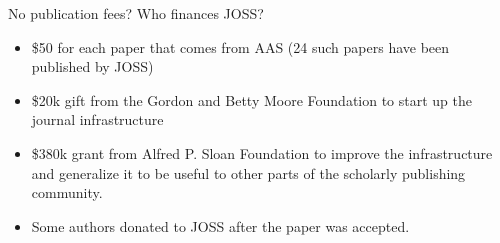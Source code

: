 \begin{frame}{No publication fees? Who finances JOSS? }

\begin{itemize}
\item \$50 for each paper that comes from AAS (24 such papers have been published by JOSS)
\item \$20k gift from the Gordon and Betty Moore Foundation to start up the journal infrastructure 
\item \$380k grant from Alfred P. Sloan Foundation to improve the infrastructure and generalize it to be useful to other parts of the scholarly publishing community. 
\item Some authors donated to JOSS after the paper was accepted.
\end{itemize}

\end{frame}

